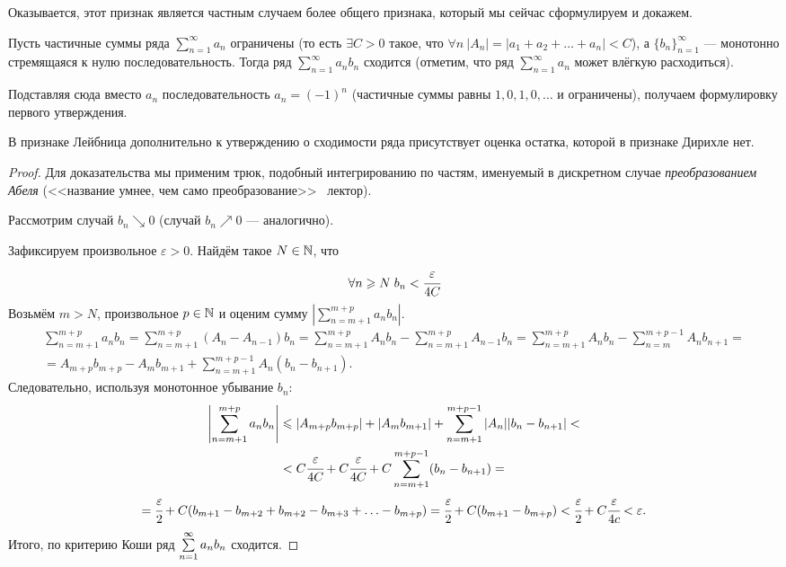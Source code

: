 \documentclass[a4paper, 12pt]{article}
\begin{document}
Оказывается, этот признак является частным случаем более общего признака, который мы сейчас сформулируем и докажем.
\begin{Test}
	Пусть частичные суммы ряда $\sum\limits_{n=1}^{\infty}a_n$ ограничены (то есть $\exists C>0$ такое, что $\forall n\ |A_n| = |a_1 + a_2 + \ldots + a_n| < C$), а $\{b_n\}_{n=1}^{\infty}$ --- монотонно стремящаяся к нулю  последовательность. Тогда ряд $\sum\limits_{n=1}^{\infty}a_nb_n$ сходится (отметим, что ряд $\sum\limits_{n=1}^{\infty}a_n$ может влёгкую расходиться). 
\end{Test}
Подставляя сюда вместо $a_n$ последовательность $a_n = (-1)^n$ (частичные суммы равны $1, 0, 1, 0, \ldots$ и ограничены), получаем формулировку первого утверждения.
\begin{Comment}
	В признаке Лейбница дополнительно к утверждению о сходимости ряда присутствует оценка остатка, которой в признаке Дирихле нет.
\end{Comment}
\begin{proof}
	Для доказательства мы применим трюк, подобный интегрированию по частям, именуемый в дискретном случае \textit{преобразованием Абеля} (<<название умнее, чем само преобразование>> \textcopyright\ лектор).
	
	Рассмотрим случай $b_n \searrow 0$ (случай $b_n \nearrow 0$ --- аналогично).
	
	Зафиксируем произвольное $\varepsilon>0$. Найдём такое $N \in \mathbb{N}$, что 
	$$
		\forall n\geqslant N\; b_n < \cfrac{\varepsilon}{4C}
	$$
	Возьмём $m>N$, произвольное $p\in \mathbb{N}$ и оценим сумму $\left|\sum\limits_{n=m + 1}^{m+p}a_n b_n\right|$.
	\begin{gather*}
		\sum\limits_{n=m+1}^{m+p} a_n b_n = \sum\limits_{n=m+1}^{m+p}\left(A_n - A_{n-1}\right)b_n = \sum\limits_{n=m+1}^{m+p} A_nb_n - \sum\limits_{n=m+1}^{m+p} A_{n-1} b_n = \sum\limits_{n=m+1}^{m+p}A_nb_n - \sum\limits_{n=m}^{m+p - 1}A_nb_{n+1} = \\
		= A_{m+p} b_{m+p} - A_mb_{m+1} + \sum\limits_{n=m+1}^{m+p - 1}A_n\left(b_n-b_{n+1}\right).
	\end{gather*}
	Следовательно, используя монотонное убывание $b_n$:
	\begin{gather*}
		\left|\sum\limits_{n=m+1}^{m+p} a_n b_n\right| \leqslant |A_{m+p}b_{m+p}| + |A_mb_{m+1}| + 		\sum\limits_{n=m+1}^{m+p-1} |A_n||b_n - b_{n+1}| <\\ < C\cfrac{\varepsilon}{4C} + C \cfrac{\varepsilon}{4C} + C 	\sum\limits_{n=m+1}^{m+p-1}( b_n - b_{n+1}) =\\= \cfrac{\varepsilon}{2} + C(b_{m+1} -b_{m+2} + b_{m + 2} - b_{m+3} + \ldots -b_{m+p}) = \cfrac{\varepsilon}{2} + C(b_{m+1} - b_{m+p}) < \cfrac{\varepsilon}{2} + C\cfrac{\varepsilon}{4c} < \varepsilon.
	\end{gather*}
	Итого, по критерию Коши ряд $\sum\limits_{n=1}^{\infty}a_nb_n$ сходится.
\end{proof}
\end{document}
